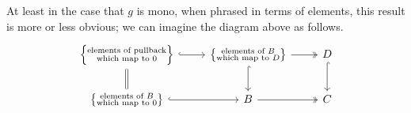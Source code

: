 \documentclass[main.tex]{subfiles}
\begin{document}
At least in the case that $g$ is mono, when phrased in terms of elements, this result is more or less obvious; we can imagine the diagram above as follows.
\begin{equation*}
  \begin{tikzcd}
    \left\{ \substack{\text{elements of pullback}\\\text{which map to $0$}} \right\}
    \arrow[r, hookrightarrow]
    \arrow[d, equals]
    & \left\{ \substack{\text{elements of $B$}\\\text{which map to $D$}} \right\}
    \arrow[r, twoheadrightarrow]
    \arrow[d, hookrightarrow]
    & D
    \arrow[d, hookrightarrow]
    \\
    \left\{ \substack{\text{elements of $B$}\\\text{which map to $0$}} \right\}
    \arrow[r, hookrightarrow]
    & B
    \arrow[r, twoheadrightarrow]
    & C
  \end{tikzcd}
\end{equation*}
\end{document}
